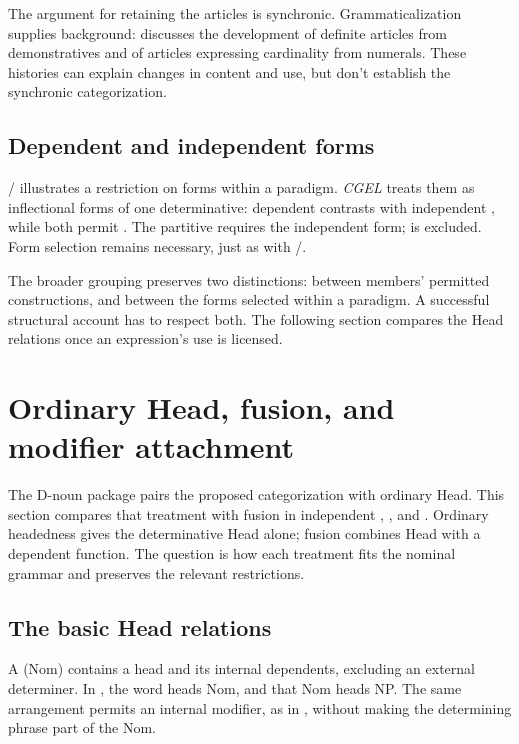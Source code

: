 \documentclass[12pt]{article}
\begin{document}
The argument for retaining the articles is synchronic. Grammaticalization supplies background: \textcite[331--336]{lyons1999} discusses the development of definite articles from demonstratives and of articles expressing cardinality from numerals. These histories can explain changes in content and use, but don't establish the synchronic categorization.

\subsection{Dependent and independent forms}\label{sec:form-selection}

/ illustrates a restriction on forms within a paradigm. \textit{CGEL} treats them as inflectional forms of one determinative: dependent  contrasts with independent , while both permit  \citep[389--390]{huddleston2002}. The partitive  requires the independent form;  is excluded. Form selection remains necessary, just as with /.

The broader grouping preserves two distinctions: between members' permitted constructions, and between the forms selected within a paradigm. A successful structural account has to respect both. The following section compares the Head relations once an expression's use is licensed.

\section{Ordinary Head, fusion, and modifier attachment}\label{sec:evidence}

The D-noun package pairs the proposed categorization with ordinary Head. This section compares that treatment with fusion in independent , , and . Ordinary headedness gives the determinative Head alone; fusion combines Head with a dependent function. The question is how each treatment fits the nominal grammar and preserves the relevant restrictions.

\subsection{The basic Head relations}\label{sec:head-relations}

A  (Nom) contains a head and its internal dependents, excluding an external determiner. In , the word  heads Nom, and that Nom heads NP. The same arrangement permits an internal modifier, as in , without making the determining phrase part of the Nom.
\end{document}
